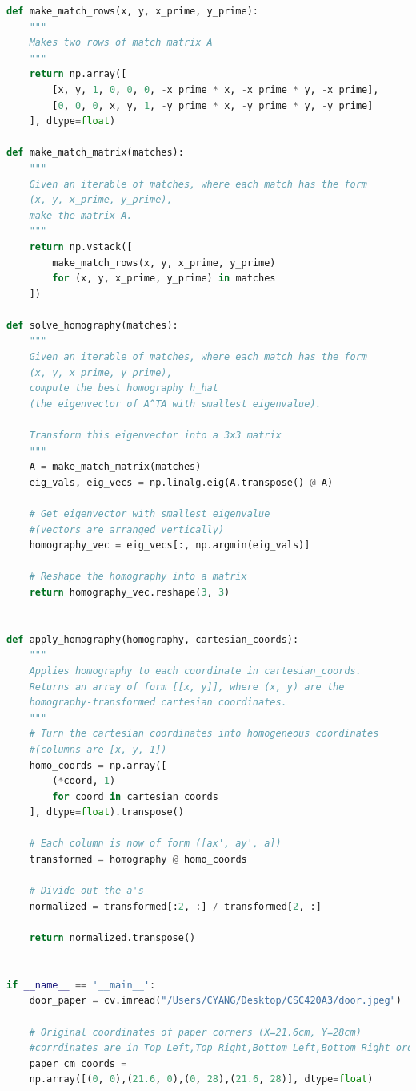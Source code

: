 \documentclass{exam}
\begin{document}
\begin{questions}
\begin{lstlisting}[language=python, frame=single]
def make_match_rows(x, y, x_prime, y_prime):
    """
    Makes two rows of match matrix A
    """
    return np.array([
        [x, y, 1, 0, 0, 0, -x_prime * x, -x_prime * y, -x_prime],
        [0, 0, 0, x, y, 1, -y_prime * x, -y_prime * y, -y_prime]
    ], dtype=float)

def make_match_matrix(matches):
    """
    Given an iterable of matches, where each match has the form 
    (x, y, x_prime, y_prime),
    make the matrix A.
    """
    return np.vstack([
        make_match_rows(x, y, x_prime, y_prime) 
        for (x, y, x_prime, y_prime) in matches
    ])

def solve_homography(matches):
    """
    Given an iterable of matches, where each match has the form 
    (x, y, x_prime, y_prime),
    compute the best homography h_hat 
    (the eigenvector of A^TA with smallest eigenvalue).
    
    Transform this eigenvector into a 3x3 matrix
    """
    A = make_match_matrix(matches)
    eig_vals, eig_vecs = np.linalg.eig(A.transpose() @ A)
    
    # Get eigenvector with smallest eigenvalue
    #(vectors are arranged vertically)
    homography_vec = eig_vecs[:, np.argmin(eig_vals)]
    
    # Reshape the homography into a matrix
    return homography_vec.reshape(3, 3)


def apply_homography(homography, cartesian_coords):
    """
    Applies homography to each coordinate in cartesian_coords.
    Returns an array of form [[x, y]], where (x, y) are the 
    homography-transformed cartesian coordinates.
    """
    # Turn the cartesian coordinates into homogeneous coordinates
    #(columns are [x, y, 1])
    homo_coords = np.array([
        (*coord, 1) 
        for coord in cartesian_coords
    ], dtype=float).transpose()
    
    # Each column is now of form ([ax', ay', a])
    transformed = homography @ homo_coords
    
    # Divide out the a's
    normalized = transformed[:2, :] / transformed[2, :]
    
    return normalized.transpose()


if __name__ == '__main__':
    door_paper = cv.imread("/Users/CYANG/Desktop/CSC420A3/door.jpeg")

    # Original coordinates of paper corners (X=21.6cm, Y=28cm)
    #corrdinates are in Top Left,Top Right,Bottom Left,Bottom Right order
    paper_cm_coords = 
    np.array([(0, 0),(21.6, 0),(0, 28),(21.6, 28)], dtype=float)


\end{lstlisting}
\end{questions}
\end{document}
